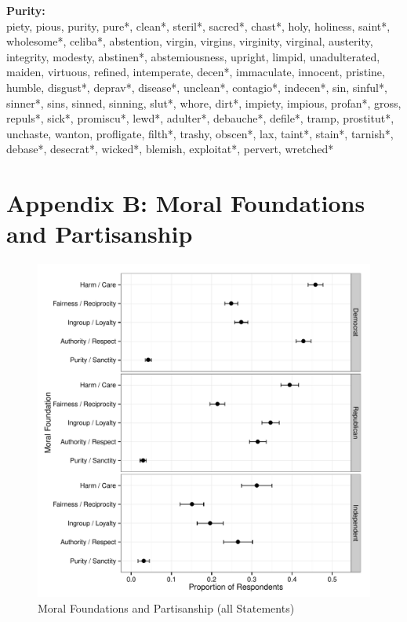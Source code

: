 \documentclass[12pt]{paper}
\begin{document}
\textbf{Purity:}\\
piety, pious, purity, pure*, clean*, steril*, sacred*, chast*, holy, holiness, saint*, wholesome*, celiba*, abstention, virgin, virgins, virginity, virginal, austerity, integrity, modesty, abstinen*, abstemiousness, upright, limpid, unadulterated, maiden, virtuous, refined, intemperate, decen*, immaculate, innocent, pristine, humble, disgust*, deprav*, disease*, unclean*, contagio*, indecen*, sin, sinful*, sinner*, sins, sinned, sinning, slut*, whore, dirt*, impiety, impious, profan*, gross, repuls*, sick*, promiscu*, lewd*, adulter*, debauche*, defile*, tramp, prostitut*, unchaste, wanton, profligate, filth*, trashy, obscen*, lax, taint*, stain*, tarnish*, debase*, desecrat*, wicked*, blemish, exploitat*, pervert, wretched*


\section*{Appendix B: Moral Foundations and Partisanship}

\begin{figure}[ht]\centering
\includegraphics[scale=.55]{../calc/fig/a1_mft_pid.pdf}
\caption{Moral Foundations and Partisanship (all Statements)}\label{fig:mft_pid}
\end{figure}
\end{document}
